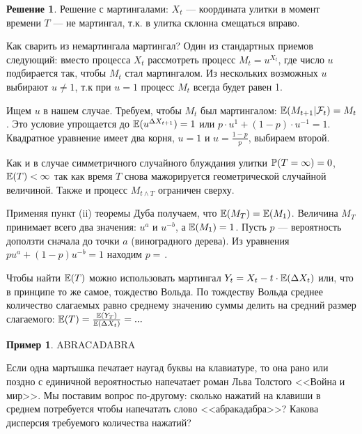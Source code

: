 \documentclass[pdftex,12pt,a4paper]{article}
\numberwithin{equation}{page} %
\theoremstyle{definition} %
\theoremstyle{definition}
\newtheorem{example}[equation]{Пример}
\theoremstyle{definition}
\newtheorem*{solution}{Решение}
\theoremstyle{definition}
\begin{document}
\begin{solution}
Решение с мартингалами: $X_{t}$ --- координата улитки в момент времени $T$ --- не мартингал, т.к. в улитка склонна смещаться вправо.

Как сварить из немартингала мартингал? Один из стандартных приемов следующий: вместо процесса $X_{t}$ рассмотреть процесс $M_{t}=u^{X_{t}}$, где число $u$ подбирается так, чтобы $M_{t}$ стал мартингалом. Из нескольких возможных $u$ выбирают $u\neq 1$, т.к при $u=1$ процесс $M_{t}$ всегда будет равен 1.

Ищем $u$ в нашем случае. Требуем, чтобы $M_{t}$ был мартингалом: $\E(M_{t+1}|\mathcal{F}_{t})=M_{t}$. Это условие упрощается до $\E(u^{\Delta{X}_{t+1}})=1$ или $p\cdot u^{1}+(1-p)\cdot u^{-1}=1$.
Квадратное уравнение имеет два корня, $u=1$ и $u=\frac{1-p}{p}$, выбираем второй.

Как и в случае симметричного случайного блуждания улитки $\P(T=\infty)=0$, $\E(T)<\infty$ так как время $T$ снова мажорируется геометрической случайной величиной. Также и процесс $M_{t\wedge T}$ ограничен сверху.

Применяя пункт (ii) теоремы Дуба получаем, что $\E(M_{T})=\E(M_{1})$. Величина $M_{T}$ принимает всего два значения: $u^{a}$ и $u^{-b}$, а $\E(M_{1})=1$. Пусть $p$ --- вероятность доползти сначала до точки $a$ (виноградного дерева). Из уравнения $pu^{a}+(1-p)u^{-b}=1$ находим $p=\frac{}{}$.

Чтобы найти $\E(T)$ можно использовать мартингал $Y_{t}=X_{t}-t\cdot \E(\Delta X_{t})$ или, что в принципе то же самое, тождество Вольда. По тождеству Вольда среднее количество слагаемых равно среднему значению суммы делить на средний размер слагаемого: $\E(T)=\frac{\E(Y_{T})}{\E(\Delta X_{t})}=...$ 
\end{solution}

\begin{example} ABRACADABRA \cite{ross:scp}\cite{williams:pwm} 

Если одна мартышка печатает наугад буквы на клавиатуре, то она рано или поздно с единичной вероятностью напечатает роман Льва Толстого <<Война и мир>>. Мы поставим вопрос по-другому: сколько нажатий на клавиши в среднем потребуется чтобы напечатать слово <<абракадабра>>? Какова дисперсия требуемого количества нажатий?
\end{example}
\end{document}
